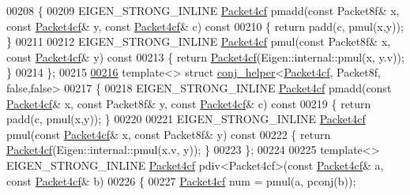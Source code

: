 \begin{DoxyCode}
00208 \{
00209   EIGEN\_STRONG\_INLINE \hyperlink{struct_eigen_1_1internal_1_1_packet4cf}{Packet4cf} pmadd(\textcolor{keyword}{const} Packet8f& x, \textcolor{keyword}{const} 
      \hyperlink{struct_eigen_1_1internal_1_1_packet4cf}{Packet4cf}& y, \textcolor{keyword}{const} \hyperlink{struct_eigen_1_1internal_1_1_packet4cf}{Packet4cf}& c)\textcolor{keyword}{ const}
00210 \textcolor{keyword}{  }\{ \textcolor{keywordflow}{return} padd(c, pmul(x,y)); \}
00211 
00212   EIGEN\_STRONG\_INLINE \hyperlink{struct_eigen_1_1internal_1_1_packet4cf}{Packet4cf} pmul(\textcolor{keyword}{const} Packet8f& x, \textcolor{keyword}{const} \hyperlink{struct_eigen_1_1internal_1_1_packet4cf}{Packet4cf}& y)\textcolor{keyword}{ const}
00213 \textcolor{keyword}{  }\{ \textcolor{keywordflow}{return} \hyperlink{struct_eigen_1_1internal_1_1_packet4cf}{Packet4cf}(Eigen::internal::pmul(x, y.v)); \}
00214 \};
00215 
\hyperlink{struct_eigen_1_1internal_1_1conj__helper_3_01_packet4cf_00_01_packet8f_00_01false_00_01false_01_4}{00216} \textcolor{keyword}{template}<> \textcolor{keyword}{struct }\hyperlink{struct_eigen_1_1internal_1_1conj__helper}{conj\_helper}<\hyperlink{struct_eigen_1_1internal_1_1_packet4cf}{Packet4cf}, Packet8f, false,false>
00217 \{
00218   EIGEN\_STRONG\_INLINE \hyperlink{struct_eigen_1_1internal_1_1_packet4cf}{Packet4cf} pmadd(\textcolor{keyword}{const} \hyperlink{struct_eigen_1_1internal_1_1_packet4cf}{Packet4cf}& x, \textcolor{keyword}{const} Packet8f& y, \textcolor{keyword}{const} 
      \hyperlink{struct_eigen_1_1internal_1_1_packet4cf}{Packet4cf}& c)\textcolor{keyword}{ const}
00219 \textcolor{keyword}{  }\{ \textcolor{keywordflow}{return} padd(c, pmul(x,y)); \}
00220 
00221   EIGEN\_STRONG\_INLINE \hyperlink{struct_eigen_1_1internal_1_1_packet4cf}{Packet4cf} pmul(\textcolor{keyword}{const} \hyperlink{struct_eigen_1_1internal_1_1_packet4cf}{Packet4cf}& x, \textcolor{keyword}{const} Packet8f& y)\textcolor{keyword}{ const}
00222 \textcolor{keyword}{  }\{ \textcolor{keywordflow}{return} \hyperlink{struct_eigen_1_1internal_1_1_packet4cf}{Packet4cf}(Eigen::internal::pmul(x.v, y)); \}
00223 \};
00224 
00225 \textcolor{keyword}{template}<> EIGEN\_STRONG\_INLINE \hyperlink{struct_eigen_1_1internal_1_1_packet4cf}{Packet4cf} pdiv<Packet4cf>(\textcolor{keyword}{const} 
      \hyperlink{struct_eigen_1_1internal_1_1_packet4cf}{Packet4cf}& a, \textcolor{keyword}{const} \hyperlink{struct_eigen_1_1internal_1_1_packet4cf}{Packet4cf}& b)
00226 \{
00227   \hyperlink{struct_eigen_1_1internal_1_1_packet4cf}{Packet4cf} num = pmul(a, pconj(b));

\end{DoxyCode}
